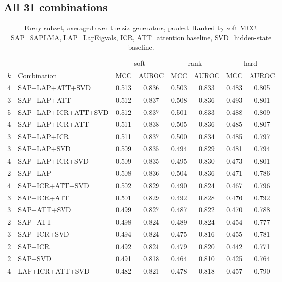 \subsection{All 31 combinations}

\begin{table}[h]\centering\footnotesize
  \caption{Every subset, averaged over the six generators, pooled. Ranked by soft
  MCC. SAP=SAPLMA, LAP=LapEigvals, ICR, ATT=attention baseline, SVD=hidden-state
  baseline.}
  \begin{tabular}{r l c c c c c c}
    \hline
    & & \multicolumn{2}{c}{soft} & \multicolumn{2}{c}{rank} & \multicolumn{2}{c}{hard} \\
    \cline{3-4}\cline{5-6}\cline{7-8}
    $k$ & Combination & MCC & AUROC & MCC & AUROC & MCC & AUROC \\
    \hline
    4 & SAP+LAP+ATT+SVD & 0.513 & 0.836 & 0.503 & 0.833 & 0.483 & 0.805 \\
    3 & SAP+LAP+ATT & 0.512 & 0.837 & 0.508 & 0.836 & 0.493 & 0.801 \\
    5 & SAP+LAP+ICR+ATT+SVD & 0.512 & 0.837 & 0.501 & 0.833 & 0.488 & 0.809 \\
    4 & SAP+LAP+ICR+ATT & 0.511 & 0.838 & 0.505 & 0.836 & 0.485 & 0.807 \\
    3 & SAP+LAP+ICR & 0.511 & 0.837 & 0.500 & 0.834 & 0.485 & 0.797 \\
    3 & SAP+LAP+SVD & 0.509 & 0.835 & 0.494 & 0.829 & 0.481 & 0.794 \\
    4 & SAP+LAP+ICR+SVD & 0.509 & 0.835 & 0.495 & 0.830 & 0.473 & 0.801 \\
    2 & SAP+LAP & 0.508 & 0.836 & 0.504 & 0.836 & 0.471 & 0.786 \\
    4 & SAP+ICR+ATT+SVD & 0.502 & 0.829 & 0.490 & 0.824 & 0.467 & 0.796 \\
    3 & SAP+ICR+ATT & 0.501 & 0.829 & 0.492 & 0.828 & 0.476 & 0.792 \\
    3 & SAP+ATT+SVD & 0.499 & 0.827 & 0.487 & 0.822 & 0.470 & 0.788 \\
    2 & SAP+ATT & 0.498 & 0.824 & 0.489 & 0.824 & 0.454 & 0.777 \\
    3 & SAP+ICR+SVD & 0.494 & 0.824 & 0.475 & 0.816 & 0.455 & 0.781 \\
    2 & SAP+ICR & 0.492 & 0.824 & 0.479 & 0.820 & 0.442 & 0.771 \\
    2 & SAP+SVD & 0.491 & 0.818 & 0.464 & 0.810 & 0.425 & 0.764 \\
    4 & LAP+ICR+ATT+SVD & 0.482 & 0.821 & 0.478 & 0.818 & 0.457 & 0.790 \\

\end{tabular}
\end{table}
